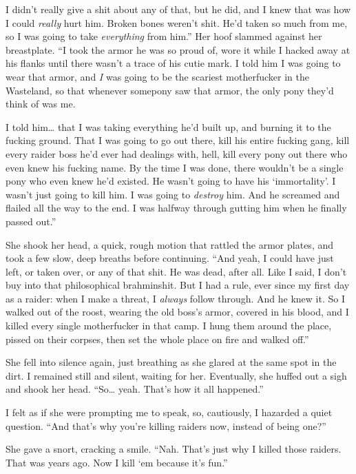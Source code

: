 \leavevmode{}I didn’t really give a shit about any of that, but he did, and I knew that was how I could \textit{really} hurt him. Broken bones weren’t shit. He’d taken so much from me, so I was going to take \textit{everything} from him.” Her hoof slammed against her breastplate. “I took the armor he was so proud of, wore it while I hacked away at his flanks until there wasn’t a trace of his cutie mark. I told him I was going to wear that armor, and \textit{I} was going to be the scariest motherfucker in the Wasteland, so that whenever somepony saw that armor, the only pony they’d think of was me.

\leavevmode{}I told him… that I was taking everything he’d built up, and burning it to the fucking ground. That I was going to go out there, kill his entire fucking gang, kill every raider boss he’d ever had dealings with, hell, kill every pony out there who even knew his fucking name. By the time I was done, there wouldn’t be a single pony who even knew he’d existed. He wasn’t going to have his ‘immortality’. I wasn’t just going to kill him. I was going to \textit{destroy} him. And he screamed and flailed all the way to the end. I was halfway through gutting him when he finally passed out.”

She shook her head, a quick, rough motion that rattled the armor plates, and took a few slow, deep breaths before continuing. “And yeah, I could have just left, or taken over, or any of that shit. He was dead, after all. Like I said, I don’t buy into that philosophical brahminshit. But I had a rule, ever since my first day as a raider: when I make a threat, I \textit{always} follow through. And he knew it. So I walked out of the roost, wearing the old boss’s armor, covered in his blood, and I killed every single motherfucker in that camp. I hung them around the place, pissed on their corpses, then set the whole place on fire and walked off.”

She fell into silence again, just breathing as she glared at the same spot in the dirt. I remained still and silent, waiting for her. Eventually, she huffed out a sigh and shook her head. “So… yeah. That’s how it all happened.”

I felt as if she were prompting me to speak, so, cautiously, I hazarded a quiet question. “And that’s why you’re killing raiders now, instead of being one?”

She gave a snort, cracking a smile. “Nah. That’s just why I killed those raiders. That was years ago. Now I kill ‘em because it’s fun.”

